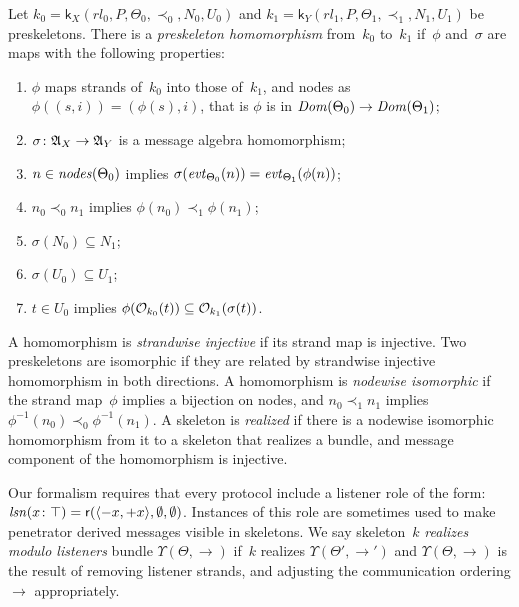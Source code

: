 \documentclass[12pt]{report}
\theoremstyle{definition}
\newcommand{\alga}{\alg{A}}
\newcommand{\sdom}{\fn{Dom}}
\newcommand{\evt}{\fn{evt}}
\newcommand{\role}{\mathsf{r}}
\newcommand{\skel}{\mathsf{k}}
\newcommand{\nodes}{\fn{nodes}}
\newcommand{\lsn}{\fn{lsn}}
\begin{document}
Let $k_0=\skel_X(rl_0,P,\Theta_0,\prec_0,N_0,U_0)$ and
$k_1=\skel_Y(rl_1,P,\Theta_1,\prec_1,N_1,U_1)$ be preskeletons.  There
is a \emph{preskeleton
  homomorphism}\label{def:preskeleton homomorphism} from~$k_0$
to~$k_1$ if~$\phi$ and~$\sigma$ are maps with the following
properties:
\begin{enumerate}
\item $\phi$ maps strands of~$k_0$ into those of~$k_1$, and nodes as
  $\phi((s,i))=(\phi(s),i)$, that is $\phi$ is in
  $\sdom(\Theta_0)\to\sdom(\Theta_1)$;
\item $\sigma\colon\alga_X\to\alga_Y$ is a message algebra homomorphism;
\item $n\in\nodes(\Theta_0)$ implies
  $\sigma(\evt_{\Theta_0}(n))=\evt_{\Theta_1}(\phi(n))$;
\item $n_0\prec_0
n_1$ implies $\phi(n_0)\prec_1\phi(n_1)$;
\item $\sigma(N_0)\subseteq N_1$;
\item $\sigma(U_0)\subseteq U_1$;
\item $t\in U_0$ implies
  $\phi(\mathcal{O}_{k_0}(t))\subseteq\mathcal{O}_{k_1}(\sigma(t))$.
\end{enumerate}

A homomorphism is \emph{strandwise injective} if its strand map is
injective.  Two preskeletons are isomorphic if they are related by
\label{def:isomorphic preskeletons}
strandwise injective homomorphism in both directions.  A homomorphism
is \emph{nodewise
  isomorphic} if the strand map~$\phi$ implies a bijection on nodes,
and $n_0\prec_1 n_1$ implies $\phi^{-1}(n_0)\prec_0\phi^{-1}(n_1)$.  A
skeleton is \emph{realized} if there is a
nodewise isomorphic homomorphism from it to a skeleton that realizes a
bundle, and message component of the homomorphism is injective.

Our formalism requires that every protocol include a
listener\label{def:listeners} role of the form:
$\lsn(x\colon\top)=\role(\seq{\inbnd x,\outbnd
  x},\emptyset,\emptyset)$.  Instances of this role are sometimes used
to make penetrator derived messages visible in skeletons.  We say
skeleton~$k$ \emph{realizes modulo listeners} bundle
$\Upsilon(\Theta,\to) $ if~$k$ realizes $\Upsilon(\Theta',\to')$ and
\hbox{$\Upsilon(\Theta,\to)$} is the result of removing listener
strands, and adjusting the communication ordering $\to$ appropriately.
\end{document}
